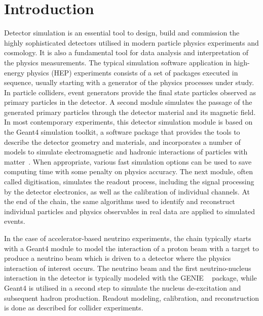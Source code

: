\documentclass[12pt,a4paper]{article}
\begin{document}

\maketitle

\newpage

\hypertarget{introduction}{%
\section{Introduction}\label{introduction}}

Detector simulation is an essential tool to design, build and commission
the highly sophisticated detectors utilised in modern particle physics
experiments and cosmology. It is also a fundamental tool for data
analysis and interpretation of the physics measurements. The typical
simulation software application in high-energy physics (HEP) experiments
consists of a set of packages executed in sequence, usually starting
with a generator of the physics processes under study. In particle
colliders, event generators provide the final state particles observed
as primary particles in the detector. A second module simulates the
passage of the generated primary particles through the detector material
and its magnetic field. In most contemporary experiments, this detector
simulation module is based on the Geant4 simulation toolkit, a software
package that provides the tools to describe the detector geometry and
materials, and incorporates a number of models to simulate
electromagnetic and hadronic interactions of particles with matter~\cite{ALLISON2016186}. 
When appropriate, various fast simulation options can be used
to save computing time with some penalty on physics accuracy. The next
module, often called digitisation, simulates the readout process,
including the signal processing by the detector electronics, as well as
the calibration of individual channels. At the end of the chain, the
same algorithms used to identify and reconstruct individual particles
and physics observables in real data are applied to simulated events.

In the case of accelerator-based neutrino experiments, the chain
typically starts with a Geant4 module to model the interaction of a
proton beam with a target to produce a neutrino beam which is driven to
a detector where the physics interaction of interest occurs. The
neutrino beam and the first neutrino-nucleus interaction in the detector
is typically modeled with the GENIE ~\cite{Andreopoulos:2009rq} package, while Geant4 is
utilised in a second step to simulate the nucleus de-excitation and
subsequent hadron production. Readout modeling, calibration, and
reconstruction is done as described for collider experiments.
\end{document}
